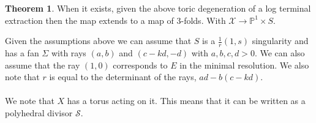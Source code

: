 \documentclass[11pt]{amsart}
\theoremstyle{definition}
\newtheorem{thm}{Theorem}[section]
\theoremstyle{definition}
\theoremstyle{definition}
\theoremstyle{definition}
\theoremstyle{definition}
\theoremstyle{definition}
\theoremstyle{definition}
\theoremstyle{definition}
\begin{document}
\newline
\begin{thm}
When it exists, given the above toric degeneration of a log terminal extraction then the map extends to a map of 3-folds. With $\mathcal{X} \rightarrow \mathbb{P}^1 \times S$.
\end{thm}
\vspace{0.1cm}
Given the assumptions above we can assume that $S$ is a $\frac{1}{r}(1,s)$ singularity and has a fan $\Sigma$ with rays $(a,b)$ and $(c-kd,-d)$ with $a,b,c,d  > 0$. We can also assume that the ray $(1,0)$ corresponds to $E$ in the minimal resolution. We also note that $r$ is equal to the determinant of the rays, $ad - b(c-kd)$. 
\\
\\
We note that $X$ has a torus acting on it. This means that it can be written as a polyhedral divisor $\mathcal{S}$.
\begin{comment}
\begin{figure}[htbp]
\psset{unit=0.95cm}
\begin{pspicture}(0,-6)(12,0)
\psframe[linecolor=white](0.5,-4.5)(3.5,-1.5)


\psline{<-|}(6,-3)(7.5,-3)
\psline{|->}(7.5,-3)(10,-3)
\rput[bl]{0}(11,-3){$\mathcal{S}_1$}
\uput*[270](7.6,-3.1){${\tiny \frac{a}{b}}$}

\psline{<-|}(6,-1.8)(7.25,-1.8)
\psline{-|}(7.25,-1.8)(8,-1.8)
\psline{->}(8,-1.8)(10,-1.8)
\uput*[270](7.2,-1.9){${\tiny {0}}$}
\uput*[270](8,-1.9){${\tiny{k}}$}
\rput[bl]{0}(11,-1.8){$\mathcal{S}_0$}
\rput[bl]{0}(9,-1.6){$\mathcal{D}_{\sigma_0}$}
\rput[bl]{0}(7.3,-1.6){$\mathcal{D}_{\sigma_1}$}


\psline{<-|}(6,-4.2)(9,-4.2)
\psline{|->}(9,-4.2)(10,-4.2)
\uput*[270](8.9,-4.3){${\tiny \frac{c-kd}{d}}$}
\rput[bl]{0}(11,-4.2){$\mathcal{S}_{\infty}$}
\rput[bl]{0}(9,-4){$\mathcal{D}_{\sigma_0}$}
\rput[bl]{0}(8,-5.5){$\mathcal{S}$}

\psline{|->}(5,-3)(5,-1)
\psline{|->}(5,-3)(5,-5)
\rput[bl]{0}(4.5,-5.5){$Y=\mathbb{P}^1$}


\end{pspicture}
\caption{Divisorial fan associated to $X$.}
\end{figure}
\end{comment}
\end{document}
